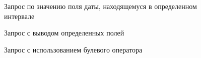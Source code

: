\begin{figure}[h!]
\caption{Запрос по значению поля даты, находящемуся в определенном интервале}
\label{ship_22:ship_22}
\end{figure}


\begin{figure}[h!]
\caption{Запрос с выводом определенных полей}
\label{ship_23:ship_23}
\end{figure}

\begin{figure}[h!]
\caption{Запрос с использованием булевого оператора}
\label{ship_24:ship_24}
\end{figure}

\clearpage
